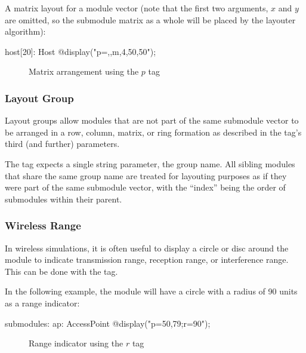 A matrix layout for a module vector (note that the first two arguments, $x$
and $y$ are omitted, so the submodule matrix as a whole will be placed by
the layouter algorithm):

\begin{ned}
host[20]: Host {
    @display("p=,,m,4,50,50");
}
\end{ned}

\begin{figure}[htbp]
  \begin{center}
    \caption{Matrix arrangement using the $p$ tag}
    \label{fig:graphics-ptag}
  \end{center}
\end{figure}


\subsubsection{Layout Group}
\label{sec:graphics:submodule-layout-group}

Layout groups allow modules that are not part of the same submodule vector to be
arranged in a row, column, matrix, or ring formation as described in the 
tag's third (and further) parameters.

The  tag expects a single string parameter, the group name. All sibling
modules that share the same group name are treated for layouting purposes as if
they were part of the same submodule vector, with the ``index'' being the order of
submodules within their parent.


\subsubsection{Wireless Range}
\label{sec:graphics:submodule-wireless-range}

In wireless simulations, it is often useful to display a circle or disc around
the module to indicate transmission range, reception range, or interference
range. This can be done with the  tag.

In the following example, the module will have a circle with a radius of 90
units as a range indicator:

\begin{ned}
submodules:
    ap: AccessPoint {
        @display("p=50,79;r=90");
    }
\end{ned}

\begin{figure}[htbp]
  \begin{center}
    \caption{Range indicator using the $r$ tag}
    \label{fig:graphics-rtag}
  \end{center}
\end{figure}

